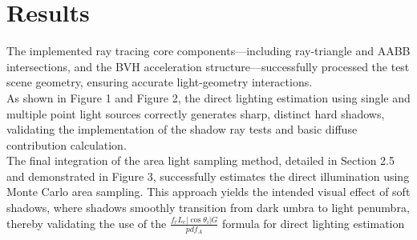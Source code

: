 \documentclass[acmtog]{acmart}
\begin{document}
\section{Results}
The implemented ray tracing core components—including ray-triangle and AABB intersections,
and the BVH acceleration structure—successfully processed the test scene geometry, ensuring
accurate light-geometry interactions.\\
As shown in Figure 1 and Figure 2, the direct lighting estimation using single and multiple
point light sources correctly generates sharp, distinct hard shadows, validating the
implementation of the shadow ray tests and basic diffuse contribution calculation.\\
The final integration of the area light sampling method, detailed in Section 2.5 and
demonstrated in Figure 3, successfully estimates the direct illumination using Monte Carlo
area sampling. This approach yields the intended visual effect of soft shadows, where
shadows smoothly transition from dark umbra to light penumbra, thereby validating the use
of the $\frac{f_rL_e|\cos\theta_i|G}{pdf_A}$ formula for direct lighting estimation
\end{document}
